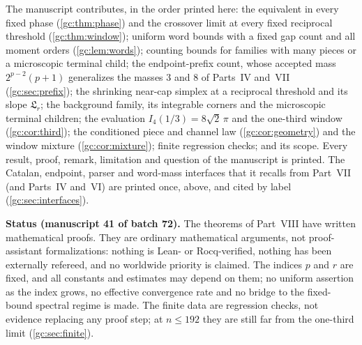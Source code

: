 \documentclass[11pt,a4paper]{article}
\theoremstyle{definition}\newaliascnt{definition}{theorem}
\theoremstyle{remark}\newaliascnt{remark}{theorem}
\begin{document}
The manuscript contributes, in the order printed here: the equivalent in every
fixed phase (\cref{gc:thm:phase}) and the crossover limit at every fixed
reciprocal threshold (\cref{gc:thm:window}); uniform word bounds with a fixed
gap count and all moment orders (\cref{gc:lem:words}); counting bounds for
families with many pieces or a microscopic terminal child; the endpoint-prefix
count, whose accepted mass $2^{p-2}(p+1)$ generalizes the masses $3$ and $8$ of
Parts~IV and~VII (\cref{gc:sec:prefix}); the shrinking near-cap simplex at a
reciprocal threshold and its slope $\mathfrak L_r$; the background family, its
integrable corners and the microscopic terminal children; the evaluation
$I_4(1/3)=8\sqrt2\,\pi$ and the one-third window (\cref{gc:cor:third}); the
conditioned piece and channel law (\cref{gc:cor:geometry}) and the window
mixture (\cref{gc:cor:mixture}); finite regression checks; and its scope.
Every result, proof, remark, limitation and question of the manuscript is
printed. The Catalan, endpoint, parser and word-mass interfaces that it recalls
from Part~VII (and Parts~IV and~VI) are printed once, above, and cited by
label (\cref{gc:sec:interfaces}).

\begin{resultbox}
\textbf{Status (manuscript 41 of batch 72).} The theorems of Part~VIII have
written mathematical proofs. They are ordinary mathematical arguments, not
proof-assistant formalizations: nothing is Lean- or Rocq-verified, nothing has
been externally refereed, and no worldwide priority is claimed. The indices
$p$ and $r$ are fixed, and all constants and estimates may depend on them; no
uniform assertion as the index grows, no effective convergence rate and no
bridge to the fixed-bound spectral regime is made. The finite data are
regression checks, not evidence replacing any proof step; at $n\le192$ they are
still far from the one-third limit (\cref{gc:sec:finite}).
\end{resultbox}
\end{document}
